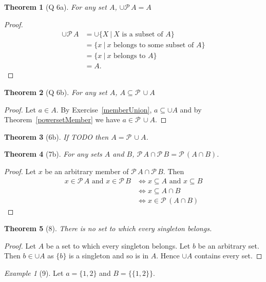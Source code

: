 \documentclass[12pt]{article}
\theoremstyle{plain}
\newtheorem*{exthm}{Theorem}
\theoremstyle{remark}
\newtheorem*{eg}{Example}
\theoremstyle{definition}
\theoremstyle{remark}
\newcommand{\powerset}{\mathscr{P}\,}
\renewcommand{\iff}{\Leftrightarrow}
\begin{document}
\begin{exthm}[Q 6a]
For any set $A$, $\cup \powerset A = A$
\end{exthm}
\begin{proof}
\begin{align*}
\cup \powerset A &= \cup \{X\ |\ \text{$X$ is a subset of $A$} \}\\
&= \{x\ |\ \text{$x$ belongs to some subset of $A$}\}\\
&= \{x\ |\ \text{$x$ belongs to $A$}\}\\
&= A.
\end{align*}
\end{proof}

\begin{exthm}[Q 6b]
For any set $A$, $A \subseteq \powerset \cup A$
\end{exthm}
\begin{proof}
Let $a \in A$. By Exercise~\ref{memberUnion}, $a \subseteq \cup A$ and by Theorem~\ref{powersetMember} we have $a \in \powerset \cup A$.
\end{proof}

\begin{exthm}[6b]
If TODO then $A = \powerset \cup A$.
\end{exthm}


\begin{exthm}[7b]
For any sets $A$ and $B$, $\powerset A \cap \powerset B = \powerset (A \cap B)$.
\end{exthm}
\begin{proof}
Let $x$ be an arbitrary member of $\powerset A \cap \powerset B$. Then
\begin{align*}
x \in \powerset A \text{ and } x \in \powerset B &\Leftrightarrow
x \subseteq A \text { and } x \subseteq B\\
&\Leftrightarrow x \subseteq A \cap B\\
&\iff x \in \powerset (A \cap B)
\end{align*}
\end{proof}

\begin{exthm}[8]
There is no set to which every singleton belongs.
\end{exthm}
\begin{proof}
Let $A$ be a set to which every singleton belongs. Let $b$ be an arbitrary set. Then $b \in \cup A$ as $\{b\}$ is a singleton and so is in $A$. Hence $\cup A$ contains every set.
\end{proof}

\begin{eg}[9]
Let $a = \{1,2\}$ and $B = \{\{1,2\}\}$.
\end{eg}
\end{document}
